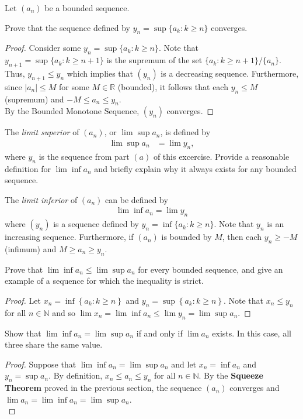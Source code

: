 \documentclass[12pt]{article}
\newcommand{\N}{\mathbb{N}}
\newcommand{\R}{\mathbb{R}}
\newenvironment{problem}[2][Problem]{\begin{trivlist} \item[\hskip \labelsep {\bfseries #1}\hskip \labelsep {\bfseries #2.}]}{\end{trivlist}}
\newenvironment{solution}[1][Solution]{\begin{trivlist} \item[\hskip \labelsep {\bfseries #1}]}{\end{trivlist}}
\begin{document}
\begin{problem}{2.4.7 (Limit Superior)}
  Let $(a_{n})$ be a bounded sequence.
\begin{enumerate}
  \item Prove that the sequence defined by $y_{n}=\sup\{a_{k}:k\geq n\}$ converges.
\begin{proof}
  Consider some $y_{n}=\sup\{a_{k}:k\geq n\}$. Note that $y_{n+1}=\sup\{a_{k}:k\geq n+1\}$ is the supremum of the set $\{a_{k}:k\geq n+1\}/\{a_{n}\}$. Thus, $y_{n+1}\leq y_{n}$ which implies that $(y_{n})$ is a decreasing sequence. Furthermore, since $|a_{n}|\leq M$ for some $M\in \R$ (bounded), it follows that each $y_{n}\leq M$ (supremum) and $-M\leq a_{n} \leq y_{n}$. \\
  By the Bounded Monotone Sequence, $(y_{n})$ converges.
\end{proof}
  \item The \textit{limit superior} of $(a_{n})$, or $\lim\sup a_{n}$, is defined by
\begin{align*}
  \lim\sup a_{n} &= \lim y_{n},
\end{align*}
where $y_{n}$ is the sequence from part $(a)$ of this excercise. Provide a reasonable definition for $\lim\inf a_{n}$ and briefly explain why it always exists for any bounded sequence.
\begin{solution}
  The \textit{limit inferior} of $(a_{n})$ can be defined by  
\begin{align*}
  \lim\inf a_{n} = \lim y_{n}
\end{align*}
where $(y_{n})$ is a sequence defined by $y_{n} = \inf\{a_{k}:k\geq n\}$. Note that $y_{n}$ is an increasing sequence. Furthermore, if $(a_{n})$ is bounded by $M$, then each $y_{n}\geq -M$ (infimum) and $M\geq a_{n} \geq y_{n}$.
\end{solution}
\item Prove that $\lim\inf a_{n} \leq \lim\sup a_{n}$ for every bounded sequence, and give an example of a sequence for which the inequality is strict.
\begin{proof}
  Let $x_{n} = \inf\left\{ a_{k}:k\geq n \right\}$ and $y_{n} = \sup\left\{ a_{k}:k\geq n \right\}$. Note that $x_{n} \leq y_{n}$ for all $n\in \N$ and so $\lim x_{n} = \lim\inf a_{n} \leq \lim y_{n}= \lim\sup a_{n}$.
\end{proof}
\item Show that $\lim\inf a_{n} = \lim\sup a_{n}$ if and only if $\lim a_{n}$ exists. In this case, all three share the same value. 
\begin{proof}
  Suppose that $\lim\inf a_{n} = \lim\sup a_{n}$ and let $x_{n} = \inf a_{n}$ and $y_{n} = \sup a_{n}$. By definition, $x_{n} \leq a_{n} \leq y_{n}$ for all $n\in \N$. By the \textbf{Squeeze Theorem} proved in the previous section, the sequence $(a_{n})$ converges and $\lim a_{n} = \lim\inf a_{n} = \lim\sup a_{n}$.\\


\end{proof}
\end{enumerate}
\end{problem}
\end{document}
